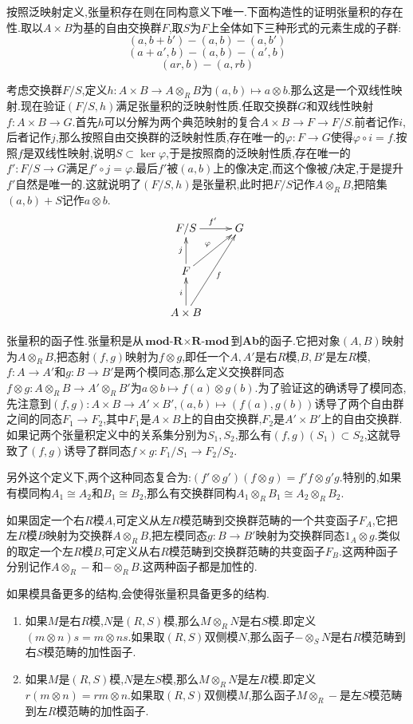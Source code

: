 按照泛映射定义,张量积存在则在同构意义下唯一.下面构造性的证明张量积的存在性.取以$A\times B$为基的自由交换群$F$,取$S$为$F$上全体如下三种形式的元素生成的子群:$$(a,b+b')-(a,b)-(a,b')$$
$$(a+a',b)-(a,b)-(a',b)$$
$$(ar,b)-(a,rb)$$

考虑交换群$F/S$,定义$h:A\times B\to A\otimes_RB$为$(a,b)\mapsto a\otimes b$.那么这是一个双线性映射.现在验证$(F/S,h)$满足张量积的泛映射性质.任取交换群$G$和双线性映射$f:A\times B\to G$.首先$h$可以分解为两个典范映射的复合$A\times B\to F\to F/S$.前者记作$i$,后者记作$j$,那么按照自由交换群的泛映射性质,存在唯一的$\varphi:F\to G$使得$\varphi\circ i=f$.按照$f$是双线性映射,说明$S\subset\ker\varphi$,于是按照商的泛映射性质,存在唯一的$f':F/S\to G$满足$f'\circ j=\varphi$.最后$f'$被$(a,b)$上的像决定,而这个像被$f$决定,于是提升$f'$自然是唯一的.这就说明了$(F/S,h)$是张量积,此时把$F/S$记作$A\otimes_RB$,把陪集$(a,b)+S$记作$a\otimes b$.
$$\xymatrix{F/S\ar[r]^{f'}&G\\
F\ar[u]^{j}\ar[ur]^{\varphi}\\
A\times B\ar[u]^{i}\ar[uur]_f}$$

张量积的函子性.张量积是从$\textbf{mod-R}\times\textbf{R-mod}$到\textbf{Ab}的函子.它把对象$(A,B)$映射为$A\otimes_RB$,把态射$(f,g)$映射为$f\otimes g$,即任一个$A,A'$是右$R$模,$B,B'$是左$R$模,$f:A\to A'$和$g:B\to B'$是两个模同态,那么定义交换群同态$f\otimes g:A\otimes_RB\to A'\otimes_RB'$为$a\otimes b\mapsto f(a)\otimes g(b)$.为了验证这的确诱导了模同态,先注意到$(f,g):A\times B\to A'\times B'$,$(a,b)\mapsto (f(a),g(b))$诱导了两个自由群之间的同态$F_1\to F_2$,其中$F_1$是$A\times B$上的自由交换群,$F_2$是$A'\times B'$上的自由交换群.如果记两个张量积定义中的关系集分别为$S_1,S_2$,那么有$(f,g)(S_1)\subset S_2$,这就导致了$(f,g)$诱导了群同态$f\times g:F_1/S_1\to F_2/S_2$.

另外这个定义下,两个这种同态复合为:$(f'\otimes g')(f\otimes g)=f'f\otimes g'g$.特别的,如果有模同构$A_1\cong A_2$和$B_1\cong B_2$,那么有交换群同构$A_1\otimes_RB_1\cong A_2\otimes_RB_2$.

如果固定一个右$R$模$A$,可定义从左$R$模范畴到交换群范畴的一个共变函子$F_A$,它把左$R$模$B$映射为交换群$A\otimes_RB$,把左模同态$g:B\to B'$映射为交换群同态$1_A\otimes g$.类似的取定一个左$R$模$B$,可定义从右$R$模范畴到交换群范畴的共变函子$F_B$.这两种函子分别记作$A\otimes_R-$和$-\otimes_RB$.这两种函子都是加性的.

如果模具备更多的结构,会使得张量积具备更多的结构.
\begin{enumerate}
	\item 如果$M$是右$R$模,$N$是$(R,S)$模,那么$M\otimes_RN$是右$S$模.即定义$(m\otimes n)s=m\otimes ns$.如果取$(R,S)$双侧模$N$,那么函子$-\otimes_SN$是右$R$模范畴到右$S$模范畴的加性函子.
	\item 如果$M$是$(R,S)$模,$N$是左$S$模,那么$M\otimes_RN$是左$R$模.即定义$r(m\otimes n)=rm\otimes n$.如果取$(R,S)$双侧模$M$,那么函子$M\otimes_R-$是左$S$模范畴到左$R$模范畴的加性函子.
\end{enumerate}

